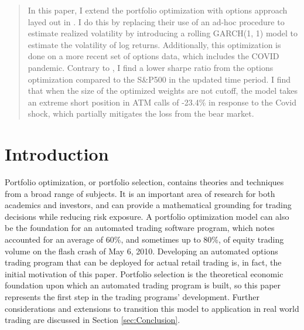 \renewcommand{\contentsname}{Table of Contents}
\tableofcontents

\clearpage

\begin{abstract}\label{sec:Abstract}
In this paper, I extend the portfolio optimization with options approach layed out in \cite{faias2017optimal}. I do this by replacing their use of an ad-hoc procedure to estimate realized volatility by introducing a rolling GARCH(1, 1) model to estimate the volatility of log returns. Additionally, this optimization is done on a more recent set of options data, which includes the COVID pandemic. Contrary to \cite{faias2017optimal}, I find a lower sharpe ratio from the options optimization compared to the S\&P500 in the updated time period. I find that when the size of the optimized weights are not cutoff, the model takes an extreme short position in ATM calls of -23.4\% in response to the Covid shock, which partially mitigates the loss from the bear market. 
\end{abstract}

\clearpage

\section{Introduction}\label{sec:Introduction}


Portfolio optimization, or portfolio selection, contains theories and techniques from a broad range of subjects. It is an important area of research for both academics and investors, and can provide a mathematical grounding for trading decisions while reducing risk exposure. A portfolio optimization model can also be the foundation for an automated trading software program, which \cite{malmgren2011computerized} notes accounted for an average of 60\%, and sometimes up to 80\%, of equity trading volume on the flash crash of May 6, 2010. Developing an automated options trading program that can be deployed for actual retail trading is, in fact, the initial motivation of this paper. Portfolio selection is the theoretical economic foundation upon which an automated trading program is built, so this paper represents the first step in the trading programs' development. Further considerations and extensions to transition this model to application in real world trading are discussed in Section \ref{sec:Conclusion}.

